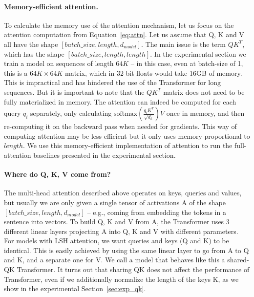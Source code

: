 \paragraph{Memory-efficient attention.}
To calculate the memory use of the attention mechanism, let us focus on
the attention computation from Equation~\ref{eq:attn}.
Let us assume that Q, K and V all have the shape
$[batch\_size, length, d_{model}]$. The main issue is
the term $QK^T$, which has the shape $[batch\_size, length, length]$.
In the experimental section we train a model on sequences of length
$64K$ -- in this case, even at batch-size of 1, this is a $64K \times 64K$
matrix, which in 32-bit floats would take 16GB of memory.
This is impractical and has hindered the use of the Transformer for long
sequences. But it is important to note that the $QK^T$ matrix does not
need to be fully materialized in memory. The attention can indeed be computed
for each query $q_i$ separately, only calculating $\mathrm{softmax}(\frac{q_iK^T}{\sqrt{d_k}})V$ 
once in memory, and then re-computing it on the backward pass when needed for gradients.
This way of computing attention may be less efficient but it only uses
memory proportional to $length$. We use this memory-efficient implementation
of attention to run the full-attention baselines presented in the experimental
section.

\paragraph{Where do Q, K, V come from?}
The multi-head attention described above operates on keys, queries and
values, but usually we are only given a single tensor of activations A
of the shape $[batch\_size, length, d_{model}]$ -- e.g., coming from
embedding the tokens in a sentence into vectors. To build Q, K and V
from A, the Transformer uses 3 different linear layers projecting A
into Q, K and V with different parameters. For models with LSH attention,
we want queries and keys (Q and K) to be identical. This is easily achieved
by using the same linear layer to go from A to Q and K, and a separate one
for V. We call a model that behaves like this a shared-QK Transformer.
It turns out that sharing QK does not affect the performance of Transformer,
even if we additionally normalize the length of the keys K,
as we show in the experimental Section~\ref{sec:exp_qk}.

